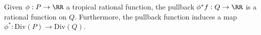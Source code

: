 

    Given $\phi: P\to \RR$ a tropical rational function, the pullback $\phi^*f: Q\to \RR$ is a rational function on $Q$. Furthermore, the pullback function induces a map $\phi^*: \mathrm{Div}(P)\to \mathrm{Div}(Q)$.


